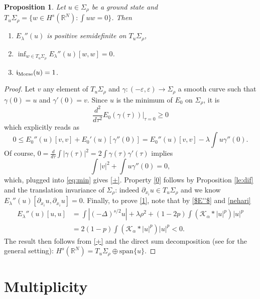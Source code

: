 \documentclass[10pt]{amsart}
\numberwithin{equation}{section}
\newtheorem{proposition}[theorem]{Proposition}
\begin{document}
\begin{proposition}
\label{morse-thm}
Let $u\in \Sigma_{\rho}$ be a ground state and $T_{ u}\Sigma_{\rho}=\{w\in {H^{s}(\mathbb R^{N})}: \int  u w=0\}$. Then 
\begin{enumerate}[label=(\roman*),ref=\roman*]
\item \label{+} $E_{\lambda}''(u)$ is positive semidefinite on $T_{ u}\Sigma_{\rho}$,
\item \label{0} $\inf_{w\in T_{u}\Sigma_{\rho}} E_{\lambda}''(u)[w,w]=0$.
\item \label{1}$\mathfrak i_{\rm Morse}(u)=1$.
\end{enumerate}
\end{proposition}

\begin{proof}
Let $v$ any element of $T_{u}\Sigma_{\rho}$ and 
 $\gamma:(-\varepsilon, \varepsilon)\to \Sigma_{\rho}$ a smooth curve such that
  $\gamma(0)=u$ and $\gamma'(0)=v$.
Since $u$ is the minimum of $E_0$ on $\Sigma_{\rho}$, it is 
\begin{equation*}\label{2derivata}
\frac{d^{2}}{d\tau^{2}}E_0(\gamma(\tau)) \Big|_{\tau=0}\geq0
\end{equation*}
which explicitly reads as
\begin{equation}\label{eq:min}
0\leq E_0''(u)[v, v]+E_0'(u)[\gamma''(0)]=E_0''(u)[v, v]-\lambda\int u \gamma''(0).
\end{equation}
Of course,  $0=\frac{d}{d\tau}\int|\gamma(\tau)|^{2}=2\int \gamma(\tau)\gamma'(\tau) $ implies 
$$\int |v|^{2}+\int u \gamma''(0)=0,$$
which, plugged into \eqref{eq:min} gives \eqref{+}. 
 Property \eqref{0}  follows by Proposition \ref{le:dif} and the translation invariance of  $\Sigma_{\rho}$: indeed
$\partial_{x_{i}}u\in T_{ u}\Sigma_{\rho}$ and 
we know $E_{\lambda}''(u)[\partial_{x_{i}}u,\partial_{x_{i}}u]=0.$
\noindent Finally, to prove \eqref{1}, 
note that by \eqref{$E''$} and  \eqref{nehari}
\begin{align*}
E_{\lambda}''(u)[  u,  u]&=  \int |(-\Delta)^{s/2} u| +\lambda \rho^{2}
+(1-2p)\int (\mathcal K_{\alpha}*|u|^{p}) |u|^{p}\\
&=2(1-p)\int (\mathcal K_{\alpha}*|u|^{p}) |u|^{p} <0.
\end{align*}
The result then follows from \eqref{+} and the direct sum decomposition (see \cite{BL} for the general setting):
$H^{s}(\mathbb R^{N})=T_{u}\Sigma_{\rho}\oplus \text{span}\{u\}.$
\end{proof}

\section{Multiplicity}
\label{SectMultiplicity}
\end{document}
